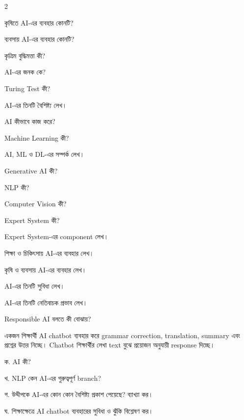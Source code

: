 \begin{topicbody}
\begin{multicols}{2}
\begin{compactenum}
\item \begin{minipage}[t]{\linewidth}কৃষিতে AI-এর ব্যবহার কোনটি?\par {}\par\end{minipage}

\item \begin{minipage}[t]{\linewidth}ব্যবসায় AI-এর ব্যবহার কোনটি?\par {}\par\end{minipage}
\end{compactenum}\end{multicols}

\begin{compactenum}
\item কৃত্রিম বুদ্ধিমত্তা কী?
\item AI-এর জনক কে?
\item Turing Test কী?
\item AI-এর তিনটি বৈশিষ্ট্য লেখ।
\item AI কীভাবে কাজ করে?
\item Machine Learning কী?
\item AI, ML ও DL-এর সম্পর্ক লেখ।
\item Generative AI কী?
\item NLP কী?
\item Computer Vision কী?
\item Expert System কী?
\item Expert System-এর component লেখ।
\item শিক্ষা ও চিকিৎসায় AI-এর ব্যবহার লেখ।
\item কৃষি ও ব্যবসায় AI-এর ব্যবহার লেখ।
\item AI-এর তিনটি সুবিধা লেখ।
\item AI-এর তিনটি নেতিবাচক প্রভাব লেখ।
\item Responsible AI বলতে কী বোঝায়?
\end{compactenum}

একজন শিক্ষার্থী AI chatbot ব্যবহার করে grammar correction, translation, summary এবং প্রশ্নের উত্তর নিচ্ছে। Chatbot শিক্ষার্থীর লেখা text বুঝে প্রয়োজন অনুযায়ী response দিচ্ছে।

\begin{compactenum}
\item ক. AI কী?
\item খ. NLP কেন AI-এর গুরুত্বপূর্ণ branch?
\item গ. উদ্দীপকে AI-এর কোন কোন বৈশিষ্ট্য প্রকাশ পেয়েছে? ব্যাখ্যা কর।
\item ঘ. শিক্ষাক্ষেত্রে AI chatbot ব্যবহারের সুবিধা ও ঝুঁকি বিশ্লেষণ কর।
\end{compactenum}


\end{topicbody}
